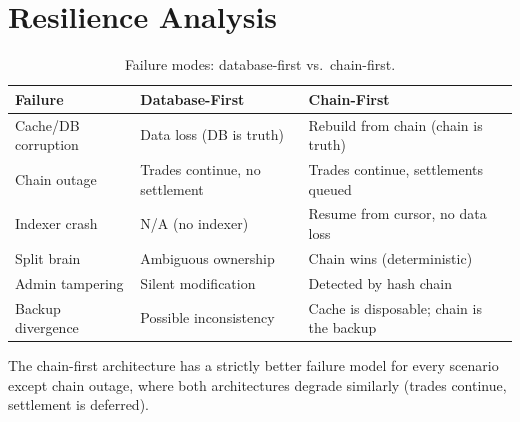 \section{Resilience Analysis}

\label{sec:resilience}

\begin{table}[h]
\centering
\begin{tabular}{p{3.5cm}p{4.5cm}p{4.5cm}}
\toprule
\textbf{Failure} & \textbf{Database-First} & \textbf{Chain-First} \\
\midrule
Cache/DB corruption & Data loss (DB is truth) & Rebuild from chain
  (chain is truth) \\
Chain outage & Trades continue, no settlement & Trades continue,
  settlements queued \\
Indexer crash & N/A (no indexer) & Resume from cursor, no data loss \\
Split brain & Ambiguous ownership & Chain wins (deterministic) \\
Admin tampering & Silent modification & Detected by hash chain \\
Backup divergence & Possible inconsistency & Cache is disposable;
  chain is the backup \\
\bottomrule
\end{tabular}
\caption{Failure modes: database-first vs.\ chain-first.}
\label{tab:failures}
\end{table}

The chain-first architecture has a strictly better failure model for
every scenario except chain outage, where both architectures degrade
similarly (trades continue, settlement is deferred).


